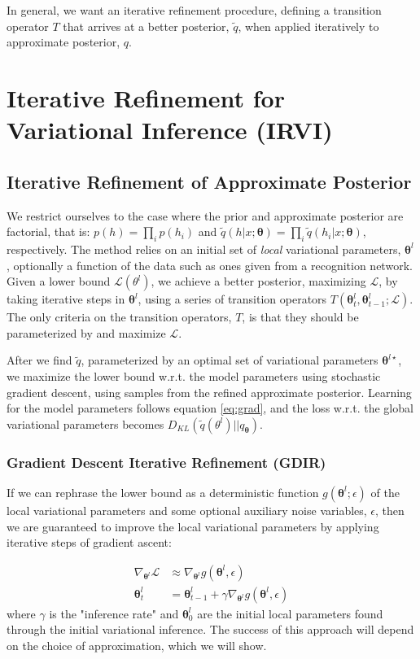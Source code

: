 \documentclass{article} %
\newcommand{\vects}[1]{\boldsymbol{#1}}
\newcommand{\TT}[0]{\vects{\theta}}
\newcommand{\grad}[0]{\nabla}
\newcommand{\LL}[0]{\mathcal{L}}
\begin{document}
In general, we want an iterative refinement procedure, defining a transition
operator $T$ that arrives at a better posterior, $\tilde{q}$, when applied
iteratively to approximate posterior, $q$. 

\section{Iterative Refinement for Variational Inference (IRVI)}

\subsection{Iterative Refinement of Approximate Posterior}
We restrict ourselves to the case where the prior and approximate posterior are
factorial, that is: $p(h) = \prod_i p(h_i)$ and $\tilde{q}(h|x; \TT) = \prod_i
\tilde{q}(h_i|x; \TT)$, respectively. The method relies on an initial set of \emph{local} variational parameters, $\TT^l$, optionally a function of the data
such as ones given from a recognition network. Given a lower bound $\LL(\theta^l)$, we achieve a better posterior, maximizing $\LL$, by taking iterative steps 
in $\TT^l$, using a series of transition operators $T(\TT^l_t, \TT^l_{t-1}; \LL)$. 
The only criteria on the transition operators, $T$, is that they should be parameterized by and maximize $\LL$.

After we find $\tilde{q}$, parameterized by an optimal set of variational parameters $\TT^{l\star}$, we maximize the lower bound w.r.t. the model
parameters using stochastic gradient descent, using samples from the refined
approximate posterior. Learning for the model parameters follows equation \ref{eq:grad}, and the loss w.r.t. the global variational parameters becomes
$D_{KL}(\tilde{q}(\theta^l)||q_{\TT})$.

\subsubsection{Gradient Descent Iterative Refinement (GDIR)}
If we can rephrase the lower bound as a deterministic function $g(\TT^l; \epsilon)$ of the local
variational parameters and some optional auxiliary noise variables, $\epsilon$,
then we are guaranteed to improve the local variational parameters by applying iterative steps
of gradient ascent:

\begin{align}
\grad_{\TT^l} \LL &\approx \grad_{\TT^l} g(\TT^l, \epsilon) \nonumber \\
\TT^l_t &= \TT^l_{t-1} + \gamma \grad_{\TT^l} g(\TT^l, \epsilon)
\end{align}
where $\gamma$ is the "inference rate" and $\TT^l_0$ are the initial local
parameters found through the initial variational inference. The success of this
approach will depend on the choice of approximation, which we will show.
\end{document}
